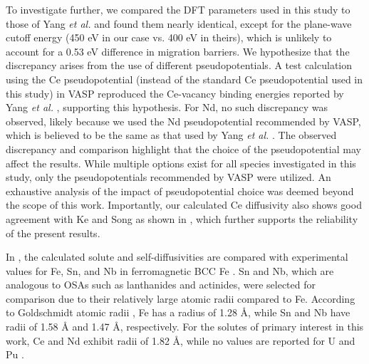 \documentclass[preprint,12pt]{elsarticle}
\begin{document}
To investigate further, we compared the DFT parameters used in this study to those of Yang \textit{et al.} \cite{yang_significant_2023} and found them nearly identical, except for the plane-wave cutoff energy (450 eV in our case vs. 400 eV in theirs), which is unlikely to account for a 0.53 eV difference in migration barriers. We hypothesize that the discrepancy arises from the use of different pseudopotentials. A test calculation using the Ce pseudopotential (instead of the standard Ce pseudopotential used in this study) in VASP reproduced the Ce-vacancy binding energies reported by Yang \textit{et al.} \cite{yang_significant_2023}, supporting this hypothesis. For Nd, no such discrepancy was observed, likely because we used the Nd pseudopotential recommended by VASP, which is believed to be the same as that used by Yang \textit{et al.} \cite{yang_significant_2023}. The observed discrepancy and comparison highlight that the choice of the pseudopotential may affect the results. While multiple options exist for all species investigated in this study, only the pseudopotentials recommended by VASP were utilized. An exhaustive analysis of the impact of pseudopotential choice was deemed beyond the scope of this work.
Importantly, our calculated Ce diffusivity also shows good agreement with Ke and Song \cite{ke2025diffusion} as shown in , which further supports the reliability of the present results.

In , the calculated solute and self-diffusivities are compared with experimental values for Fe, Sn, and Nb in ferromagnetic BCC Fe \cite{lubbehusen1990self, hettich1977self, torres2000diffusion, herzig2002niobium}. Sn and Nb, which are analogous to OSAs such as lanthanides and actinides, were selected for comparison due to their relatively large atomic radii compared to Fe. According to Goldschmidt atomic radii \cite{brandes2013smithells}, Fe has a radius of 1.28 Å, while Sn and Nb have radii of 1.58 Å and 1.47 Å, respectively. For the solutes of primary interest in this work, Ce and Nd exhibit radii of 1.82 Å, while no values are reported for U and Pu \cite{brandes2013smithells}.
\end{document}
